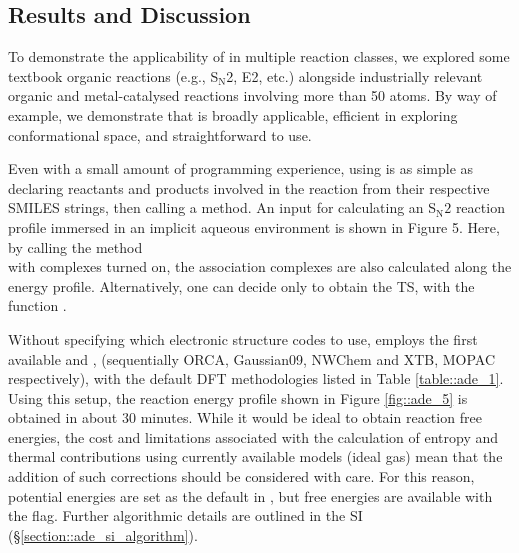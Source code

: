 \documentclass[../../main.tex]{subfiles}
\begin{document}
\subsection{Results and Discussion}

To demonstrate the applicability of \ade in multiple reaction classes, we explored some textbook organic reactions (e.g., S$_\text{N}$2, E2, etc.) alongside industrially relevant organic and metal-catalysed reactions involving more than 50 atoms. By way of example, we demonstrate that \ade is broadly applicable, efficient in exploring conformational space, and straightforward to use.

Even with a small amount of programming experience, using \ade is as simple as declaring reactants and products involved in the reaction from their respective SMILES strings, then calling a method. An input for calculating an S${}_\text{N}2$ reaction profile immersed in an implicit aqueous environment is shown in Figure 5. Here, by calling the method  \\
 with complexes turned on, the association complexes are also calculated along the energy profile. Alternatively, one can decide only to obtain the TS, with the function  .

Without specifying which electronic structure codes to use, \ade employs the first available \hmethodx and \lmethod, (sequentially ORCA, Gaussian09, NWChem and XTB, MOPAC respectively), with the default DFT methodologies listed in Table \ref{table::ade_1}. Using this setup, the reaction energy profile shown in Figure \ref{fig::ade_5} is obtained in about 30 minutes. While it would be ideal to obtain reaction free energies, the cost and limitations associated with the calculation of entropy and thermal contributions using currently available models (ideal gas) mean that the addition of such corrections should be considered with care. For this reason, potential energies are set as the default in \ade, but free energies are available with the  flag. Further algorithmic details are outlined in the SI (§\ref{section::ade_si_algorithm}).
\end{document}
